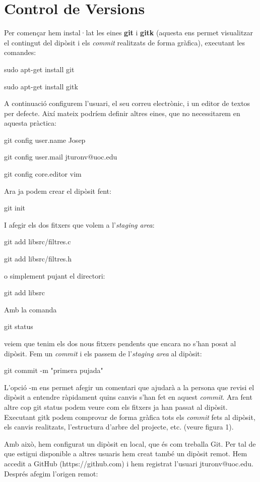 \documentclass{article}
\begin{document}
\section{Control de Versions}
Per començar hem instal·lat les eines \textbf{git} i \textbf{gitk} (aquesta ens permet visualitzar el contingut del dipòsit i els \textit{commit} realitzats de forma gràfica), executant les comandes:\bigskip

\qquad sudo apt-get install git\bigskip

\qquad sudo apt-get install gitk\bigskip

A continuació configurem l'usuari, el seu correu electrònic, i un editor de textos per defecte. Així mateix podríem definir altres eines, que no necessitarem en aquesta pràctica:\bigskip

\qquad git config user.name Josep\bigskip

\qquad git config user.mail jturonv@uoc.edu\bigskip

\qquad git config core.editor vim\bigskip

Ara ja podem crear el dipòsit fent:\bigskip

\qquad git init\bigskip

I afegir els dos fitxers que volem a l'\textit{staging area}:\bigskip

\qquad git add libsrc/filtres.c\bigskip

\qquad git add libsrc/filtres.h\bigskip

o simplement pujant el directori:\bigskip

\qquad git add libsrc\bigskip

Amb la comanda\bigskip

\qquad git status\bigskip

veiem que tenim els dos nous fitxers pendents que encara no s'han posat al dipòsit. Fem un \textit{commit} i els passem de l'\textit{staging area} al dipòsit:\bigskip

\qquad git commit -m "primera pujada"\bigskip

L'opció -m ens permet afegir un comentari que ajudarà a la persona que revisi el dipòsit a entendre ràpidament quins canvis s'han fet en aquest \textit{commit}. Ara fent altre cop git status podem veure com els fitxers ja han passat al dipòsit. Executant gitk podem comprovar de forma gràfica tots els \textit{commit} fets al dipòsit, els canvis realitzats, l'estructura d'arbre del projecte, etc. (veure figura 1). \bigskip

Amb això, hem configurat un dipòsit en local, que és com treballa Git. Per tal de que estigui disponible a altres usuaris hem creat també un dipòsit remot. Hem accedit a GitHub (https://github.com) i hem registrat l'usuari jturonv@uoc.edu. Després afegim l'origen remot:\bigskip
\end{document}
